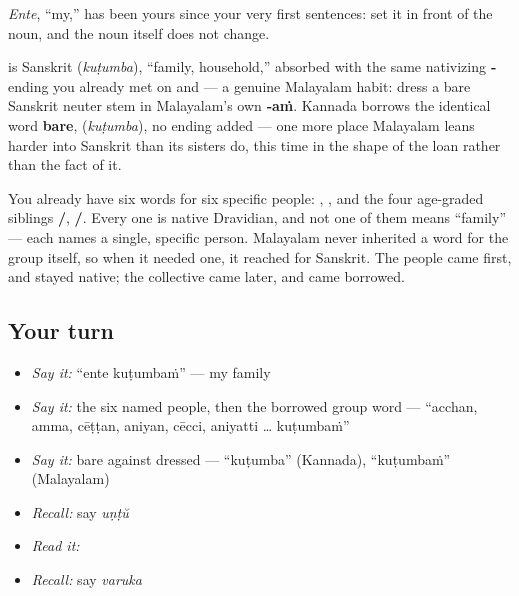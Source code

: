\emph{Ente}, \textquotedblleft{}my,\textquotedblright{} has been yours since your very first sentences: set it in front of the noun, and the noun itself does not change.

\begin{cousinweb}
\textbf{} is Sanskrit \textbf{ } (\emph{kuṭumba}), \textquotedblleft{}family, household,\textquotedblright{} absorbed with the same nativizing \textbf{‑} ending you already met on \textbf{} and \textbf{} — a genuine Malayalam habit: dress a bare Sanskrit neuter stem in Malayalam's own \textbf{‑aṁ}. Kannada borrows the identical word \textbf{bare}, \textbf{} (\emph{kuṭumba}), no ending added — one more place Malayalam leans harder into Sanskrit than its sisters do, this time in the shape of the loan rather than the fact of it.

You already have six words for six specific people: \textbf{}, \textbf{}, and the four age-graded siblings \textbf{/}, \textbf{/}. Every one is native Dravidian, and not one of them means \textquotedblleft{}family\textquotedblright{} — each names a single, specific person. Malayalam never inherited a word for the group itself, so when it needed one, it reached for Sanskrit. The people came first, and stayed native; the collective came later, and came borrowed.
\end{cousinweb}

\subsection*{Your turn}
\begin{itemize}
\raggedright
  \item \emph{Say it:} \textquotedblleft{}ente kuṭumbaṁ\textquotedblright{} — my family
  \item \emph{Say it:} the six named people, then the borrowed group word — \textquotedblleft{}acchan, amma, cēṭṭan, aniyan, cēcci, aniyatti … kuṭumbaṁ\textquotedblright{}
  \item \emph{Say it:} bare against dressed — \textquotedblleft{}kuṭumba\textquotedblright{} (Kannada), \textquotedblleft{}kuṭumbaṁ\textquotedblright{} (Malayalam)
  \item \emph{Recall:} say \emph{uṇṭŭ}
  \item \emph{Read it:} \textbf{}
  \item \emph{Recall:} say \emph{varuka}
\end{itemize}

